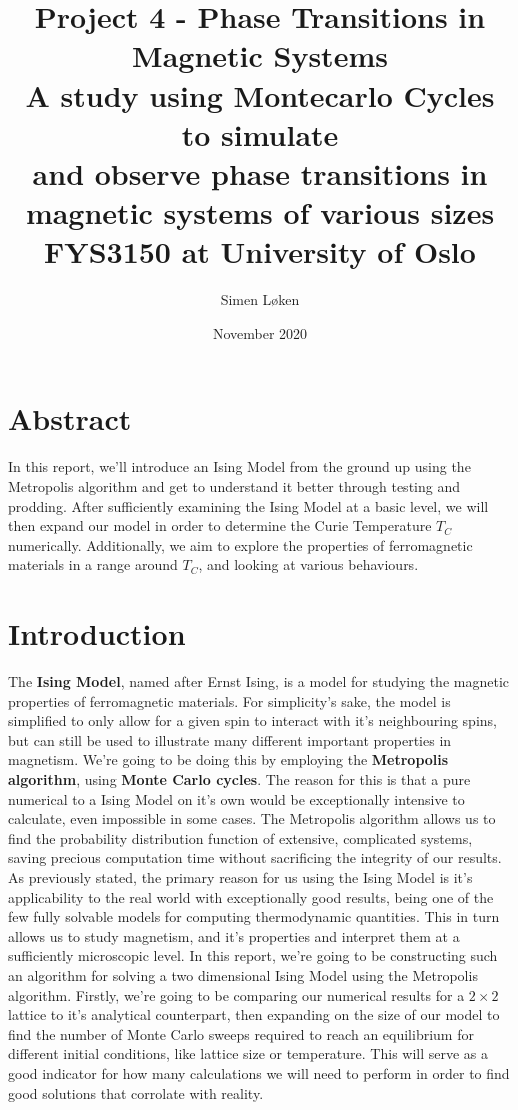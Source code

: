 \documentclass{article}
\title{%
Project 4 - Phase Transitions in Magnetic Systems \\
\Large A study using Montecarlo Cycles to simulate \\
\Large and observe phase transitions in \\
\Large magnetic systems of various sizes \\
\large FYS3150 at University of Oslo}
\author{Simen Løken}
\date{November 2020}
\begin{document}
\nocite{projtext}
\maketitle
\tableofcontents
\section{Abstract}
In this report, we'll introduce an Ising Model from the ground up using the Metropolis algorithm and get to understand it better through testing and prodding. After sufficiently examining the Ising Model at a basic level, we will then expand our model in order to determine the Curie Temperature $T_C$ numerically. Additionally, we aim to explore the properties of ferromagnetic materials in a range around $T_C$, and looking at various behaviours.
\section{Introduction}
The \textbf{Ising Model}, named after Ernst Ising, is a model for studying the magnetic properties of ferromagnetic materials. For simplicity's sake, the model is simplified to only allow for a given spin to interact with it's neighbouring spins, but can still be used to illustrate many different important properties in magnetism. \newline
We're going to be doing this by employing the \textbf{Metropolis algorithm}, using \textbf{Monte Carlo cycles}. The reason for this is that a pure numerical to a Ising Model on it's own would be exceptionally intensive to calculate, even impossible in some cases. \newline
The Metropolis algorithm allows us to find the probability distribution function of extensive, complicated systems, saving precious computation time without sacrificing the integrity of our results. 
\newline
As previously stated, the primary reason for us using the Ising Model is it's applicability to the real world with exceptionally good results, being one of the few fully solvable models for computing thermodynamic quantities. This in turn allows us to study magnetism, and it's properties and interpret them at a sufficiently microscopic level.
\newline
In this report, we're going to be constructing such an algorithm for solving a two dimensional Ising Model using the Metropolis algorithm. Firstly, we're going to be comparing our numerical results for a $2\times2$ lattice to it's analytical counterpart, then expanding on the size of our model to find the number of Monte Carlo sweeps required to reach an equilibrium for different initial conditions, like lattice size or temperature. This will serve as a good indicator for how many calculations we will need to perform in order to find good solutions that corrolate with reality.\newline
\end{document}
